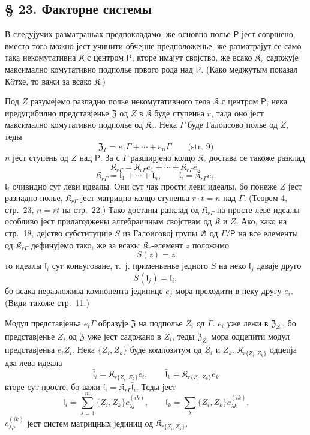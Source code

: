 \documentclass[11pt]{article}
\begin{document}
\subsection*{§ 23. Факторне системы}\label{faktorensysteme}

В следујучих разматраньах предпокладамо, же основно полье \(\mathsf P\) јест совршено; вместо тога можно јест учинити обчејше предположенье, же разматрајут се само така некомутативна \(\mathfrak K\) с центром \(\mathsf P\), кторе имајут својство, же всако \(\mathfrak K_r\) садржује максимално комутативно подполье првого рода над \(\mathsf P\). (Како меджутым показал Кöтхе, то важи за всако \(\mathfrak K\).)

Под \(Z\) разумејемо разпадно полье некомутативного тела \(\mathfrak K\) с центром \(\mathsf P\); нека иредуцибилно представјенье \(\mathfrak Z\) од \(Z\) в \(\mathfrak K\) буде ступеньа \(r\), тада оно јест максимално комутативно подполье од \(\mathfrak K_r\). Нека \(\Gamma\) буде Галоисово полье од \(Z\), теды
\[
\mathfrak Z_\Gamma=e_1\Gamma+\cdots+e_n\Gamma
\qquad\text{(str.~9)}
\]
\(n\) јест ступень од \(Z\) над \(\mathsf P\). За с \(\Gamma\) разширјено колцо \(\mathfrak K_r\) достава се такоже разклад
\[
\mathfrak K_{r\Gamma}=\mathfrak K_{r\Gamma}e_1+\cdots+\mathfrak K_{r\Gamma}e_n
\]
\[
\mathfrak K_{r\Gamma}=\mathfrak l_1+\cdots+\mathfrak l_n,\qquad
\mathfrak l_i=\mathfrak K_{r\Gamma}e_i.
\]
\(\mathfrak l_i\) очивидно сут леви идеалы. Они сут чак прости леви идеалы, бо понеже \(Z\) јест разпадно полье, \(\mathfrak K_{r\Gamma}\) јест матрицно колцо ступеньа \(r\cdot t=n\) над \(\Gamma\). (Теорем 4, стр.~23, \(n=rt\) на стр.~22.) Тако достаны разклад од \(\mathfrak K_{r\Gamma}\) на просте леве идеалы особливо јест прилагоджены алгебраичным својствам од \(\mathfrak K\) и \(Z\). Ако, како на стр.~18, дејство субституције \(S\) из Галоисовој групы \(\mathfrak G\) од \(\Gamma/\mathsf P\) на все елементы од \(\mathfrak K_{r\Gamma}\) дефинујемо тако, же за всакы \(\mathfrak K_r\)-елемент \(z\) положимо
\[
S(z)=z
\]
то идеалы \(\mathfrak l_i\) сут коньуговане, т.~ј. применьенье једного \(S\) на неко \(\mathfrak l_j\) даваје друго
\[
S(\mathfrak l_j)=\mathfrak l_i,
\]
бо всака неразложива компонента јединице \(e_j\) мора преходити в неку другу \(e_i\). (Види такоже стр.~11.)

Модул представјеньа \(e_i\Gamma\) образује \(\mathfrak Z\) на подполье \(Z_i\) од \(\Gamma\). \(e_i\) уже лежи в \(\mathfrak Z_{Z_i}\), бо представјенье \(Z_i\) од \(\mathfrak Z\) уже јест садржано в \(Z_i\), теды \(\mathfrak Z_{Z_i}\) мора одцепити модул представјеньа \(e_iZ_i\). Нека \(\{Z_i,Z_k\}\) буде композитум од \(Z_i\) и \(Z_k\). \(\mathfrak K_{r\{Z_i,Z_k\}}\) одцепја два лева идеала
\[
\bar{\mathfrak l}_i=\mathfrak K_{r\{Z_i,Z_k\}}e_i,\qquad
\bar{\mathfrak l}_k=\mathfrak K_{r\{Z_i,Z_k\}}e_k
\]
кторе сут просте, бо важи \(\mathfrak l_i=\mathfrak K_{r\Gamma}\bar{\mathfrak l}_i\). Теды јест
\[
\bar{\mathfrak l}_i=\sum_{\lambda=1}^m\{Z_i,Z_k\}c_{\lambda i}^{(ik)},\qquad
\bar{\mathfrak l}_k=\sum_{\lambda}\{Z_i,Z_k\}c_{\lambda k}^{(ik)}.
\]
\(c_{\lambda\rho}^{(ik)}\) јест систем матрицных јединиц од \(\mathfrak K_{r\{Z_i,Z_k\}}\).
\end{document}
